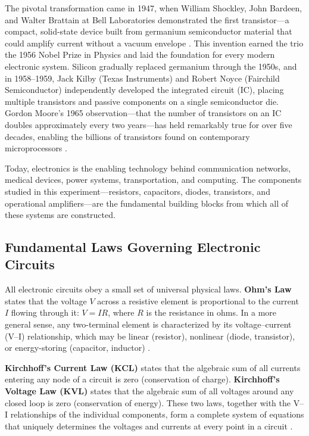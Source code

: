 \documentclass[12pt, a4paper, twoside]{report}
\begin{document}
The pivotal transformation came in 1947, when William Shockley, John Bardeen, and Walter
Brattain at Bell Laboratories demonstrated the first transistor---a compact, solid-state
device built from germanium semiconductor material that could amplify current without a
vacuum envelope \cite{razavi2013}. This invention earned the trio the 1956 Nobel Prize in
Physics and laid the foundation for every modern electronic system. Silicon gradually
replaced germanium through the 1950s, and in 1958--1959, Jack Kilby (Texas Instruments)
and Robert Noyce (Fairchild Semiconductor) independently developed the integrated circuit
(IC), placing multiple transistors and passive components on a single semiconductor die.
Gordon Moore's 1965 observation---that the number of transistors on an IC doubles
approximately every two years---has held remarkably true for over five decades, enabling
the billions of transistors found on contemporary microprocessors \cite{sedra2020}.

Today, electronics is the enabling technology behind communication networks, medical
devices, power systems, transportation, and computing. The components studied in this
experiment---resistors, capacitors, diodes, transistors, and operational amplifiers---are
the fundamental building blocks from which all of these systems are constructed.

\subsection*{Fundamental Laws Governing Electronic Circuits}

All electronic circuits obey a small set of universal physical laws. \textbf{Ohm's Law}
states that the voltage $V$ across a resistive element is proportional to the current $I$
flowing through it: $V = IR$, where $R$ is the resistance in ohms. In a more general
sense, any two-terminal element is characterized by its voltage--current (V--I)
relationship, which may be linear (resistor), nonlinear (diode, transistor), or
energy-storing (capacitor, inductor) \cite{floyd2012}.

\textbf{Kirchhoff's Current Law (KCL)} states that the algebraic sum of all currents
entering any node of a circuit is zero (conservation of charge). \textbf{Kirchhoff's
Voltage Law (KVL)} states that the algebraic sum of all voltages around any closed loop
is zero (conservation of energy). These two laws, together with the V--I relationships of
the individual components, form a complete system of equations that uniquely determines
the voltages and currents at every point in a circuit \cite{floyd2012}.
\end{document}
